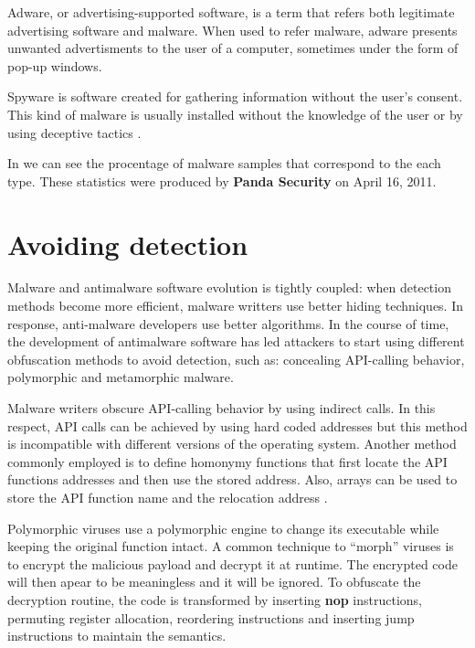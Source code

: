 Adware, or advertising-supported software, is a term that refers both legitimate advertising software and malware. When used to refer malware, adware presents unwanted advertisments to the user of a computer, sometimes under the form of pop-up windows.

Spyware is software created for gathering information without the user's consent. This kind of malware is usually installed without the knowledge of the user or by using deceptive tactics \cite{mal-behavior-analysis}.

In  we can see the procentage of malware samples that correspond to the each type. These statistics were produced by \textbf{Panda Security} on April 16, 2011.


\section{Avoiding detection}
\label{sec:avoid-det}

Malware and antimalware software evolution is tightly coupled: when detection methods become more efficient, malware writters use better hiding techniques. In response, anti-malware developers use better algorithms. In the course of time, the development of antimalware software has led attackers to start using different obfuscation methods to avoid detection, such as: concealing API-calling behavior, polymorphic and metamorphic malware.

Malware writers obscure API-calling behavior by using indirect calls. In this respect, API calls can be achieved by using hard coded addresses but this method is incompatible with different versions of the operating system. Another method commonly employed is to define homonymy functions that first locate the API functions addresses and then use the stored address. Also, arrays can be used to store the API function name and the relocation address \cite{static-detection-behavior}.

Polymorphic viruses use a polymorphic engine to change its executable while keeping the original function intact. A common technique to ``morph'' viruses is to encrypt the malicious payload and decrypt it at runtime. The encrypted code will then apear to be meaningless and it will be ignored. To obfuscate the decryption routine, the code is transformed by inserting \textbf{nop} instructions, permuting register allocation, reordering instructions and inserting jump instructions to maintain the semantics.

